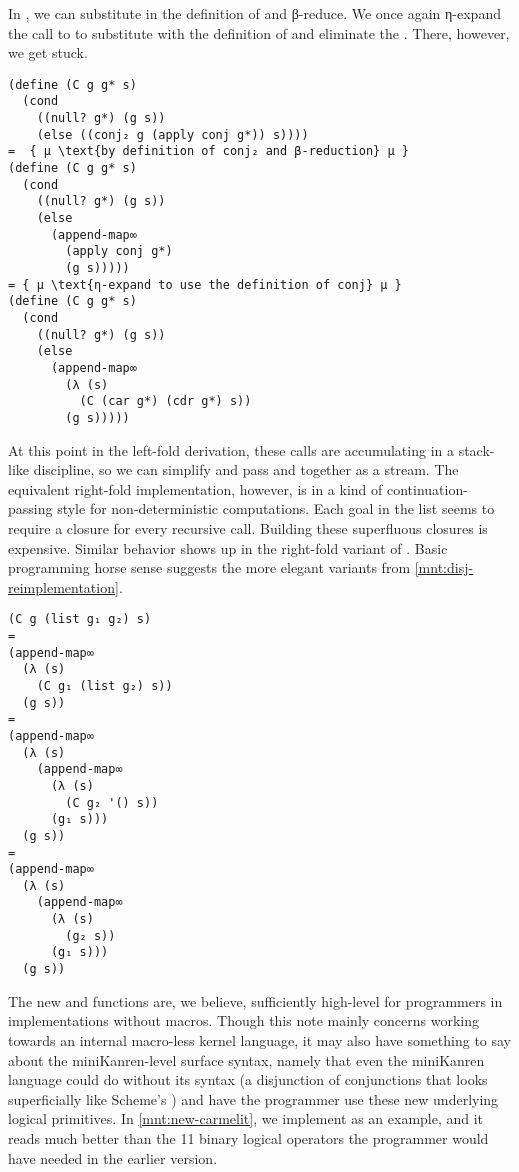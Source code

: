 \documentclass[sigplan,balance=true,pbalance=true,natbib=false]{acmart}
\begin{document}
In , we can substitute in the definition of
 and β-reduce. We once again η-expand the call to
 to substitute with the definition of
 and eliminate the . There,
however, we get stuck.

\begin{verbatim}
(define (C g g* s)
  (cond
    ((null? g*) (g s))
    (else ((conj₂ g (apply conj g*)) s))))
=  { µ \text{by definition of conj₂ and β-reduction} µ }
(define (C g g* s)
  (cond
    ((null? g*) (g s))
    (else
      (append-map∞
        (apply conj g*)
        (g s)))))
= { µ \text{η-expand to use the definition of conj} µ }
(define (C g g* s)
  (cond
    ((null? g*) (g s))
    (else
      (append-map∞
        (λ (s)
          (C (car g*) (cdr g*) s))
        (g s)))))
\end{verbatim}

At this point in the left-fold derivation, these calls are
accumulating in a stack-like discipline, so we can simplify and pass
 and  together as a stream. The equivalent
right-fold implementation, however, is in a kind of
continuation-passing style for non-deterministic computations. Each
goal in the list seems to require a closure for every recursive call.
Building these superfluous closures is expensive. Similar behavior
shows up in the right-fold variant of . Basic
programming horse sense suggests the more elegant variants from
\cref{mnt:disj-reimplementation}.

\begin{verbatim}
(C g (list g₁ g₂) s)
=
(append-map∞
  (λ (s)
    (C g₁ (list g₂) s))
  (g s))
=
(append-map∞
  (λ (s)
    (append-map∞
      (λ (s)
        (C g₂ '() s))
      (g₁ s)))
  (g s))
=
(append-map∞
  (λ (s)
    (append-map∞
      (λ (s)
        (g₂ s))
      (g₁ s)))
  (g s))
\end{verbatim}

The new  and  functions are, we
believe, sufficiently high-level for programmers in implementations
without macros. Though this note mainly concerns working towards an
internal macro-less kernel language, it may also have something to say
about the miniKanren-level surface syntax, namely that even the
miniKanren language could do without its  syntax (a
disjunction of conjunctions that looks superficially like
Scheme's ) and have the programmer use these new
underlying logical primitives. In \cref{mnt:new-carmelit}, we
implement  as an example, and it reads
much better than the 11 binary logical operators the programmer would
have needed in the earlier version.
\end{document}
